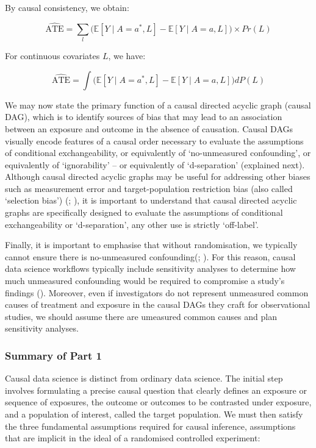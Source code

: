 \documentclass[
  single column]{article}
\begin{document}
By causal consistency, we obtain:

\[
\widehat{\text{ATE}} =  \sum_l \big( \mathbb{E}[Y \mid A = a^*, L] - \mathbb{E}[Y \mid A = a, L] \big) \times Pr(L)
\]

For continuous covariates \(L\), we have:

\[
\widehat{\text{ATE}} = \int \big( \mathbb{E}[Y \mid A = a^*, L] - \mathbb{E}[Y \mid A = a, L] \big) dP(L)
\]

We may now state the primary function of a causal directed acyclic graph
(causal DAG), which is to identify sources of bias that may lead to an
association between an exposure and outcome in the absence of causation.
Causal DAGs visually encode features of a causal order necessary to
evaluate the assumptions of conditional exchangeability, or equivalently
of `no-unmeasured confounding', or equivalently of `ignorability' -- or
equivalently of `d-separation' (explained next). Although causal
directed acyclic graphs may be useful for addressing other biases such
as measurement error and target-population restriction bias (also called
`selection bias') (;
), it is
important to understand that causal directed acyclic graphs are
specifically designed to evaluate the assumptions of conditional
exchangeability or `d-separation', any other use is strictly
`off-label'.

Finally, it is important to emphasise that without randomisation, we
typically cannot ensure there is no-unmeasured
confounding(;
). For this reason, causal
data science workflows typically include sensitivity analyses to
determine how much unmeasured confounding would be required to
compromise a study's findings
(). Moreover,
even if investigators do not represent unmeasured common causes of
treatment and exposure in the causal DAGs they craft for observational
studies, we should assume there are umeasured common causes and plan
sensitivity analyses.

\subsubsection{Summary of Part 1}\label{summary-of-part-1}

Causal data science is distinct from ordinary data science. The initial
step involves formulating a precise causal question that clearly defines
an exposure or sequence of exposures, the outcome or outcomes to be
contrasted under exposure, and a population of interest, called the
target population. We must then satisfy the three fundamental
assumptions required for causal inference, assumptions that are implicit
in the ideal of a randomised controlled experiment:
\end{document}
